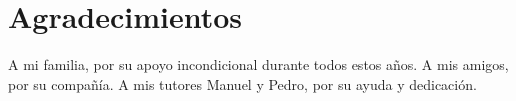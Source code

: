 

\chapter*{Agradecimientos}

A mi familia, por su apoyo incondicional durante todos estos años. A mis amigos, por su compañía.
A mis tutores Manuel y Pedro, por su ayuda y dedicación.


\endinput
